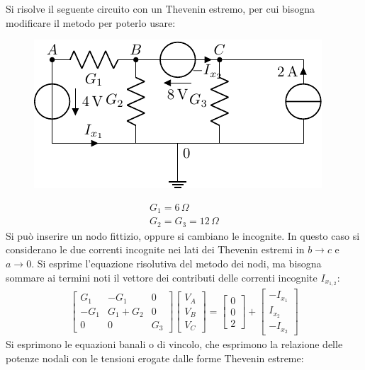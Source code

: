 \documentclass{article}
\numberwithin{equation}{subsection}
\begin{document}
Si risolve il seguente circuito con un Thevenin estremo, per cui bisogna modificare il metodo per poterlo usare:
\begin{figure}[H]%
    \centering
    \includegraphics{circuito-2.pdf}%
    \label{fig:circuito-2}
\end{figure}
\begin{gather*}
    G_1=6\,\Omega\\
    G_2=G_3=12\,\Omega
\end{gather*}
Si può inserire un nodo fittizio, oppure si cambiano le incognite. In questo caso si considerano le due correnti incognite nei lati dei Thevenin estremi in $b\to c$ e $a\to0$. 
Si esprime l'equazione risolutiva del metodo dei nodi, ma bisogna sommare ai termini noti il vettore dei contributi delle correnti incognite $I_{x_{1,2}}$: 
\begin{gather*}
    \begin{bmatrix}
        G_1&-G_1&0\\-G_1&G_1+G_2&0\\0&0&G_3
    \end{bmatrix}\begin{bmatrix}
        V_A\\V_B\\V_C
    \end{bmatrix}=\begin{bmatrix}
        0\\0\\2
    \end{bmatrix}+\begin{bmatrix}
        -I_{x_1}\\I_{x_2}\\-I_{x_2}
    \end{bmatrix}
\end{gather*}
Si esprimono le equazioni banali o di vincolo, che esprimono la relazione delle potenze nodali con le tensioni erogate dalle forme Thevenin estreme: 
\end{document}
